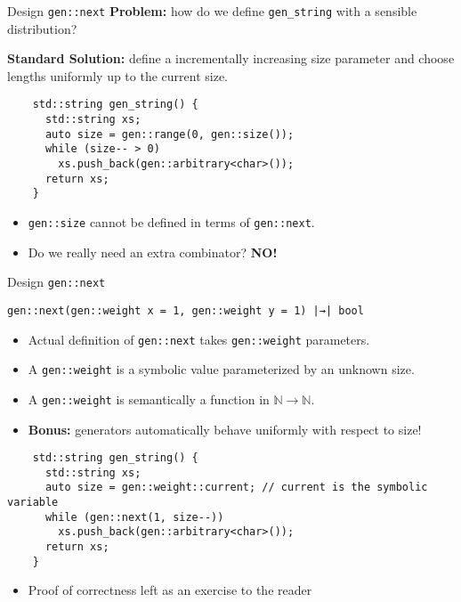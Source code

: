 \begin{frame}[fragile,t]{\halcheck{} \textemdash{} Design \textemdash{} \texttt{gen::next}}
  \textbf{Problem:} how do we define \texttt{gen_string} with a sensible distribution?

  \pause{}

  \textbf{Standard Solution:} define a incrementally increasing size parameter and choose lengths uniformly up to the current size.

  \begin{verbatim}
    std::string gen_string() {
      std::string xs;
      auto size = gen::range(0, gen::size());
      while (size-- > 0)
        xs.push_back(gen::arbitrary<char>());
      return xs;
    }
  \end{verbatim}

  \pause{}

  \begin{itemize}
    \item \texttt{gen::size} cannot be defined in terms of \texttt{gen::next}.
    \item Do we really need an extra combinator? \pause\textbf{NO!}
  \end{itemize}
\end{frame}

\begin{frame}[fragile,t]{\halcheck{} \textemdash{} Design \textemdash{} \texttt{gen::next}}
  \begin{center}
    \texttt{gen::next(gen::weight x = 1, gen::weight y = 1) |→| bool}
  \end{center}

  \begin{itemize}
    \item Actual definition of \texttt{gen::next} takes \texttt{gen::weight} parameters.
    \item A \texttt{gen::weight} is a symbolic value parameterized by an unknown size.
    \item A \texttt{gen::weight} is semantically a function in $\mathbb{N} \to \mathbb{N}$.
    \item \textbf{Bonus:} generators automatically behave uniformly with respect to size!
  \end{itemize}

  \begin{verbatim}
    std::string gen_string() {
      std::string xs;
      auto size = gen::weight::current; // current is the symbolic variable
      while (gen::next(1, size--))
        xs.push_back(gen::arbitrary<char>());
      return xs;
    }
  \end{verbatim}

  \begin{itemize}
    \item Proof of correctness left as an exercise to the reader \smiley{}
  \end{itemize}
\end{frame}

